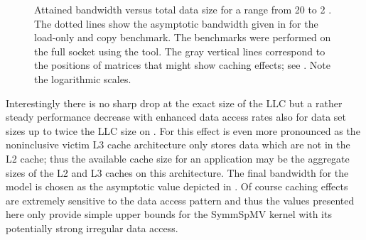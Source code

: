 \begin{figure}[t]
	\centering
	\caption{Attained bandwidth versus total data size for a range from 20 \MB to 2 \GB. The dotted lines show the asymptotic bandwidth given in  for the load-only and copy benchmark. The benchmarks were performed on the full socket using the \likwidBench tool. The gray vertical lines correspond to the positions of matrices that might show caching effects; see . Note the logarithmic scales.}
	\label{fig:size_vs_bw}
\end{figure}
Interestingly there is no sharp drop at the exact size of the \acrshort{LLC} but a rather steady performance decrease with enhanced data access rates also for data set sizes up to twice the \acrshort{LLC} size on \IVB. For \SKX this effect is even more pronounced as the noninclusive victim L3 cache architecture only stores data which are not in the L2 cache; thus the available cache size for an application may be the aggregate sizes of the L2 and L3 caches on this architecture.  The final bandwidth for the  \roofline model is chosen as the asymptotic value depicted in . Of course caching effects are extremely sensitive to the data access pattern and thus the values presented here only provide simple upper bounds for the \acrshort{SymmSpMV} kernel with its potentially strong irregular data access. 

